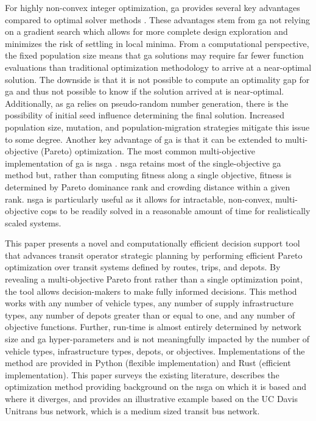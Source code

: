 For highly non-convex integer optimization, \gls{ga} provides several key advantages compared to optimal solver methods \cite{Hajela_1990_AIAA}. These advantages stem from \gls{ga} not relying on a gradient search which allows for more complete design exploration and minimizes the risk of settling in local minima. From a computational perspective, the fixed population size means that \gls{ga} solutions may require far fewer function evaluations than traditional optimization methodology to arrive at a near-optimal solution. The downside is that it is not possible to compute an optimality gap for \gls{ga} and thus not possible to know if the solution arrived at is near-optimal. Additionally, as \gls{ga} relies on pseudo-random number generation, there is the possibility of initial seed influence determining the final solution. Increased population size, mutation, and population-migration strategies mitigate this issue to some degree. Another key advantage of \gls{ga} is that it can be extended to multi-objective (Pareto) optimization. The most common multi-objective implementation of \gls{ga} is \gls{nsga} \cite{Deb_2002_TEC}. \gls{nsga} retains most of the single-objective \gls{ga} method but, rather than computing fitness along a single objective, fitness is determined by Pareto dominance rank and crowding distance within a given rank. \gls{nsga} is particularly useful as it allows for intractable, non-convex, multi-objective \glspl{cop} to be readily solved in a reasonable amount of time for realistically scaled systems.

This paper presents a novel and computationally efficient decision support tool that advances transit operator strategic planning by performing efficient Pareto optimization over transit systems defined by routes, trips, and depots. By revealing a multi-objective Pareto front rather than a single optimization point, the tool allows decision-makers to make fully informed decisions. This method works with any number of vehicle types, any number of supply infrastructure types, any number of depots greater than or equal to one, and any number of objective functions. Further, run-time is almost entirely determined by network size and \gls{ga} hyper-parameters and is not meaningfully impacted by the number of vehicle types, infrastructure types, depots, or objectives. Implementations of the method are provided in Python (flexible implementation) and Rust (efficient implementation). This paper surveys the existing literature, describes the optimization method providing background on the \gls{nsga} on which it is based and where it diverges, and provides an illustrative example based on the UC Davis Unitrans bus network, which is a medium sized transit bus network.

